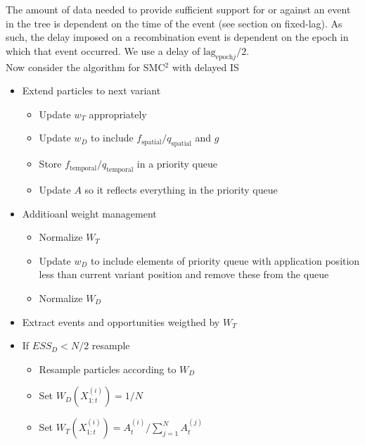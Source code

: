 \documentclass{article}
\begin{document}
\noindent The amount of data needed to provide sufficient support for or against an event in the tree
is dependent on the time of the event (see section on fixed-lag). As such, the delay imposed on a 
recombination event is dependent on the epoch in which that event occurred. We use a delay of
$\text{lag}_{\text{epoch} j}/2$. \\


\noindent Now consider the algorithm for SMC$^2$ with delayed IS

\begin{itemize}
\item Extend particles to next variant
 \begin{itemize}
 \item Update $w_T$ appropriately
 \item Update $w_D$ to include $f_{\text{spatial}}/q_{\text{spatial}}$ and $g$
 \item Store $f_{\text{temporal}}/q_{\text{temporal}}$ in a priority queue
 \item Update $A$ so it reflects everything in the priority queue
 \end{itemize}
\item Additioanl weight management
 \begin{itemize}
 \item Normalize $W_T$
 \item Update $w_D$ to include elements of priority queue with application position less than current variant position and remove these from the queue
 \item Normalize $W_D$
 \end{itemize}
\item Extract events and opportunities weigthed by $W_T$
\item If $ESS_D<N/2$ resample
 \begin{itemize}
 \item Resample particles according to $W_D$
 \item Set $ W_D(X_{1:t}^{(i)}) = 1/N $
 \item Set $ W_T(X_{1:t}^{(i)}) = A_t^{(i)} / \sum_{j=1}^N A_t^{(j)} $
 \end{itemize}
\end{itemize}
\end{document}
